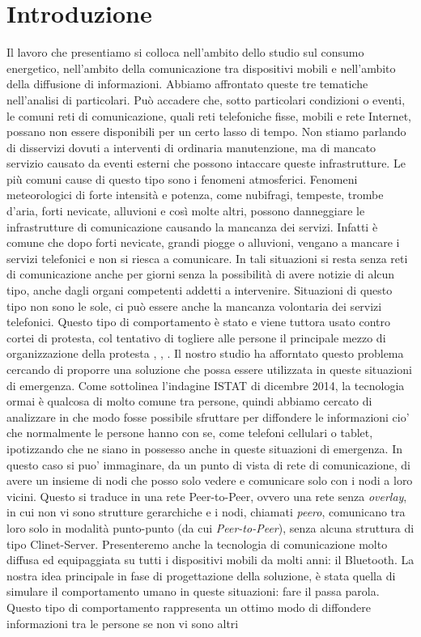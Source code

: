 \chapter{Introduzione}
\label{chap:Introduzione}

Il lavoro che presentiamo si colloca nell'ambito dello studio sul consumo energetico, nell'ambito della comunicazione tra dispositivi mobili e nell'ambito della diffusione di informazioni. Abbiamo affrontato queste tre tematiche nell'analisi di particolari. Può accadere che, sotto particolari condizioni o eventi, le comuni reti di comunicazione, quali reti telefoniche fisse, mobili e rete Internet, possano non essere disponibili per un certo lasso di tempo. Non stiamo parlando di disservizi dovuti a interventi di ordinaria manutenzione, ma di mancato servizio causato da eventi esterni che possono intaccare queste infrastrutture. Le più comuni cause di questo tipo sono i fenomeni atmosferici. Fenomeni meteorologici di forte intensità e potenza, come nubifragi, tempeste, trombe d'aria, forti nevicate, alluvioni e così molte altri, possono danneggiare le infrastrutture di comunicazione causando la mancanza dei servizi. Infatti è comune che dopo forti nevicate, grandi piogge o alluvioni, vengano a mancare i servizi telefonici e non si riesca a comunicare. In tali situazioni si resta senza reti di comunicazione anche per giorni senza la possibilità di avere notizie di alcun tipo, anche dagli organi competenti addetti a intervenire. Situazioni di questo tipo non sono le sole, ci può essere anche la mancanza volontaria dei servizi telefonici. Questo tipo di comportamento è stato e viene tuttora usato contro cortei di protesta, col tentativo di togliere alle persone il principale mezzo di organizzazione della protesta \cite{wemakehistory2014-articolo}, \cite{wemakehistory2014-fattoq}, \cite{wemakehistory2014-lastampa}. Il nostro studio ha afforntato questo problema cercando di proporre una soluzione che possa essere utilizzata in queste situazioni di emergenza. Come sottolinea l'indagine ISTAT di dicembre 2014\cite{istat2014}, la tecnologia ormai è qualcosa di molto comune tra persone, quindi abbiamo cercato di analizzare in che modo fosse possibile sfruttare per diffondere le informazioni cio' che normalmente le persone hanno con se, come telefoni cellulari o tablet, ipotizzando che ne siano in possesso anche in queste situazioni di emergenza. In questo caso si puo' immaginare, da un punto di vista di rete di comunicazione, di avere un insieme di nodi che posso solo vedere e comunicare solo con i nodi a loro vicini. Questo si traduce in una rete Peer-to-Peer, ovvero una rete senza \textit{overlay}, in cui non vi sono strutture gerarchiche e i nodi, chiamati \textit{peero}, comunicano tra loro solo in modalità punto-punto (da cui \textit{Peer-to-Peer}), senza alcuna struttura di tipo Clinet-Server. Presenteremo anche la tecnologia di comunicazione molto diffusa ed equipaggiata su tutti i dispositivi mobili da molti anni: il Bluetooth. La nostra idea principale in fase di progettazione della soluzione, è stata quella di simulare il comportamento umano in queste situazioni: fare il passa parola. Questo tipo di comportamento rappresenta un ottimo modo di diffondere informazioni tra le persone se non vi sono altri 